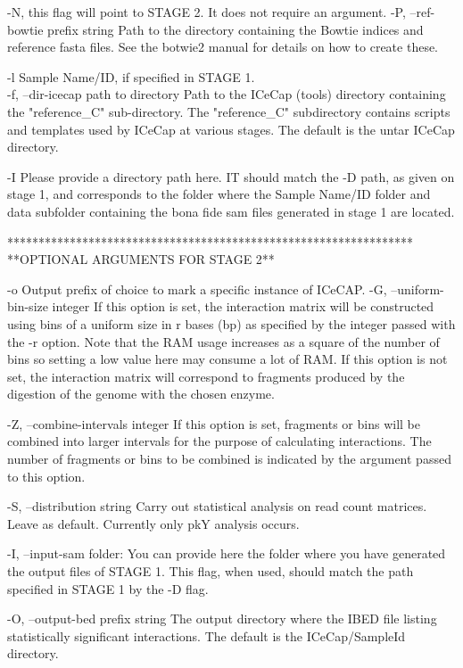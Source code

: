 \documentclass[10pt,a4paper]{article}
\begin{document}
        -N, this flag will point to STAGE 2. It does not require an argument.
        -P, --ref-bowtie prefix string     Path to the directory containing the Bowtie indices and reference fasta files. See the botwie2 manual for details on how to create these.

        -l Sample Name/ID, if specified in STAGE 1.\\

        -f, --dir-icecap path to directory     Path to the ICeCap (tools) directory containing the "reference\_C" sub-directory.  The "reference\_C" subdirectory contains scripts and templates used by ICeCap at various stages.  The default is the untar ICeCap directory.

        -I Please provide a directory path here. IT should match the -D path, as given on stage 1, and corresponds to the folder where the Sample Name/ID folder and data subfolder containing the bona fide sam files generated in stage 1 are located. 

*****************************************************************\\
**OPTIONAL ARGUMENTS FOR STAGE 2**

      -o  Output prefix of choice to mark a specific instance of ICeCAP.
      -G, --uniform-bin-size integer    If this option is set, the interaction matrix will be constructed using bins of a uniform size in r bases (bp) as specified by the integer passed with the -r option.  Note that the RAM usage increases as a square of the number of bins so setting a low value here may consume a lot of RAM.  If this option is not set, the interaction matrix will correspond to fragments produced by the digestion of the genome with the chosen enzyme.

      -Z, --combine-intervals integer    If this option is set, fragments or bins will be combined into larger intervals for the purpose of calculating interactions.  The number of fragments or bins to be combined is indicated by the argument passed to this option.


      -S, --distribution string    Carry out statistical analysis on read count matrices.  Leave as default. Currently only pkY analysis occurs.

      -I, --input-sam folder: You can provide here the folder where you have generated the output files of STAGE 1. This flag, when used, should match the path specified in STAGE 1 by the        -D flag.

      -O, --output-bed prefix string    The output directory where the IBED file listing statistically significant interactions. The default is the ICeCap/SampleId directory.
\end{document}
